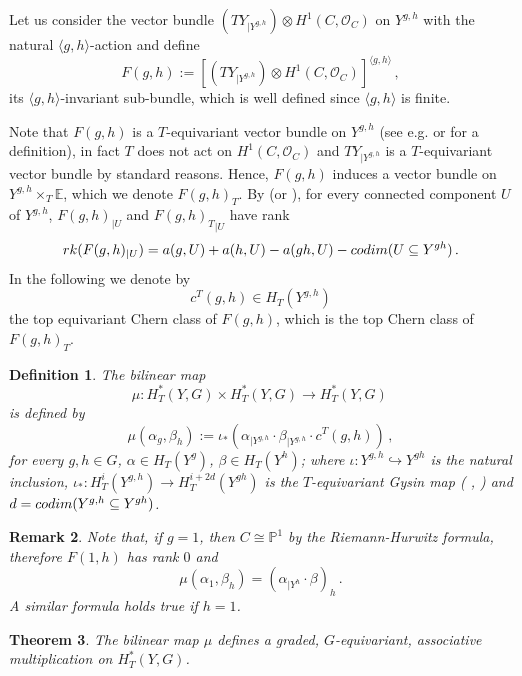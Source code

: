 \documentclass[10pt,a4paper]{amsart}
\newtheorem{thm}{Theorem}[section]
\newtheorem{dfn}[thm]{Definition}
\newtheorem{rmk}[thm]{Remark}
\newcommand{\E}{\mathbb{E}}
\newcommand{\pr}{\mathbb{P}}   %
\newcommand{\cO}{\mathcal{O}} %
\newcommand{\1}{\mathds{1}}   %
\begin{document}
Let us consider the vector bundle $\left( TY_{|Y^{g,h}}\right) \otimes H^1(C, \cO_C)$ on $Y^{g,h}$ with the natural 
$\langle g, h\rangle$-action and define 
$$
F(g,h) := \left[ \left( TY_{|Y^{g,h}}\right) \otimes H^1(C, \cO_C)\right]^{\langle g, h\rangle} \, ,
$$
its $\langle g, h\rangle$-invariant sub-bundle, which is well defined since $\langle g, h\rangle$ is finite. 

Note that $F(g, h)$ is a $T$-equivariant vector bundle on $Y^{g,h}$ (see e.g.   
\cite[Ch. 2.3]{AF} or \cite[Prop. 3.2]{BGNX} for a definition), in fact
$T$ does not act on $H^1(C, \cO_C)$ and $TY_{|Y^{g,h}}$ is a $T$-equivariant vector bundle by standard reasons.
Hence, $F(g, h)$ induces a vector bundle on $Y^{g, h} \times_T \E$, which we denote $F(g, h)_T$. 
By \cite[Lemma 1.12]{FG03} (or \cite[Ch. 8]{JKK07}),
for every connected component $U$ of $Y^{g,h}$, $F(g,h)_{|U}$ and ${F(g,h)_T}_{|U}$ have  rank 
\begin{equation}\label{rkFgh}
{\rm rk}(F(g, h)_{|U}) =a(g, U) + a(h,U) - a(gh, U) - {\rm codim}(U\subseteq Y^{gh}) \, .
\end{equation}
In the following we denote by 
$$
c^T(g, h) \in H_T(Y^{g,h}) 
$$ 
the top equivariant Chern class of $F(g,h)$, which is the top Chern class of $F(g,h)_T$.

\begin{dfn}
The bilinear map 
$$
\mu \colon H^*_T(Y, G) \times H^*_T(Y, G) \to H^*_T(Y, G) \, 
$$
is defined by
$$
\mu (\alpha_g, \beta_h) := \iota_* \left( \alpha_{|Y^{g,h}} \cdot \beta_{|Y^{g,h}} \cdot c^T(g,h) \right) \, ,
$$
for every $g, h \in G$, $\alpha \in H_T(Y^g)$, $\beta \in H_T(Y^h)$; where
$\iota \colon Y^{g, h} \hookrightarrow Y^{gh}$ is the natural  inclusion, $\iota_* \colon H^i_T(Y^{g,h}) \to H^{i+2d}_T(Y^{gh})$ 
is the $T$-equivariant Gysin map ( \cite[Ch. 3.6]{AF}, \cite{BGNX}) and $d= {\rm codim} (Y^{g,h} \subseteq Y^{gh})$.
\end{dfn}

\begin{rmk}\label{mu1}
Note that, if $g=1$, then $C\cong \pr^1$ by the  Riemann-Hurwitz formula, therefore 
$F(1,h)$ has rank $0$ and 
$$
\mu (\alpha_1, \beta_h) =  \left( \alpha_{|Y^{h}} \cdot \beta  \right)_h \, . 
$$
A similar formula holds true if $h=1$.
\end{rmk}


\begin{thm}
The bilinear map $\mu$ defines a graded, $G$-equivariant, associative multiplication on $H^*_T(Y, G)$. 
\end{thm}
\end{document}
